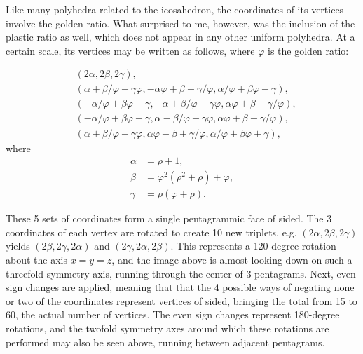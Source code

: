 \documentclass{article}
\begin{document}
Like many polyhedra related to the icosahedron,
the coordinates of its vertices involve the golden ratio.
What surprised to me, however,
was the inclusion of the plastic ratio as well,
which does not appear in any other uniform polyhedra.
At a certain scale, its vertices may be written as follows,
where $\varphi$ is the golden ratio:

\begin{align*}
  & (2\alpha, 2\beta, 2\gamma), \\
  & (\alpha+\beta/\varphi+\gamma\varphi,
  -\alpha\varphi+\beta+\gamma/\varphi,
  \alpha/\varphi+\beta\varphi-\gamma), \\
  & (-\alpha/\varphi+\beta\varphi+\gamma,
  -\alpha+\beta/\varphi-\gamma\varphi,
  \alpha\varphi+\beta-\gamma/\varphi), \\
  & (-\alpha/\varphi+\beta\varphi-\gamma,
  \alpha-\beta/\varphi-\gamma\varphi,
  \alpha\varphi+\beta+\gamma/\varphi), \\
  & (\alpha+\beta/\varphi-\gamma\varphi,
  \alpha\varphi-\beta+\gamma/\varphi,
  \alpha/\varphi+\beta\varphi+\gamma),
\end{align*}
where
\begin{align*}
  \alpha &= \rho+1, \\
  \beta &= \varphi^2(\rho^2+\rho)+\varphi, \\
  \gamma &= \rho(\varphi+\rho).
\end{align*}

These 5 sets of coordinates form a single pentagrammic face of sided.
The 3 coordinates of each vertex are rotated to create 10 new triplets,
e.g. $(2\alpha, 2\beta, 2\gamma)$ yields
$(2\beta, 2\gamma, 2\alpha)$ and $(2\gamma, 2\alpha, 2\beta)$.
This represents a 120-degree rotation about the axis $x=y=z$,
and the image above is almost looking down on such a threefold symmetry axis,
running through the center of 3 pentagrams.
Next, even sign changes are applied,
meaning that that the 4 possible ways of negating none or two of the coordinates
represent vertices of sided,
bringing the total from 15 to 60, the actual number of vertices.
The even sign changes represent 180-degree rotations,
and the twofold symmetry axes around which these rotations are performed
may also be seen above, running between adjacent pentagrams.
\end{document}
